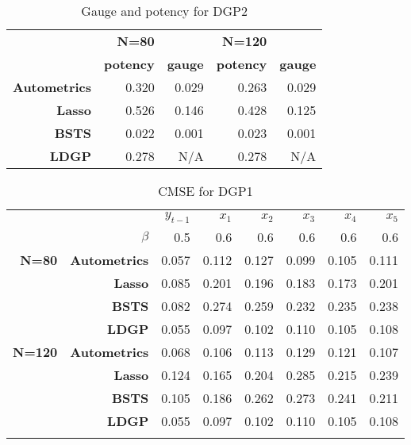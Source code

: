 \documentclass[11pt, oneside]{book}   	%
\begin{document}
\begin{table}[htbp]
  \centering

    \begin{tabular}{rrrrr}

          & \textbf{N=80} & \textbf{} & \textbf{N=120} & \textbf{} \\

          & \textbf{potency} & \textbf{gauge} & \textbf{potency} & \textbf{gauge} \\
    \textbf{Autometrics} & 0.320 & 0.029 & 0.263 & 0.029 \\
    \textbf{Lasso} & 0.526 & 0.146 & 0.428 & 0.125 \\
    \textbf{BSTS} & 0.022 & 0.001 & 0.023 & 0.001 \\
    \textbf{LDGP} & 0.278 & N/A   & 0.278 & N/A \\

    \end{tabular}%
      \caption{Gauge and potency for DGP2}
  \label{DGP2GP}%
\end{table}%





\begin{table}[htbp]
  \centering

    \begin{tabular}{rrrrrrrr}

          &       & $y_{t-1}$ & $x_{1}$ & $x_{2}$ & $x_{3}$ & $x_{4}$ & $x_{5}$ \\

          & $\beta$ & 0.5   & 0.6   & 0.6   & 0.6   & 0.6   & 0.6 \\
    \textbf{N=80} & \textbf{Autometrics} & 0.057 & 0.112 & 0.127 & 0.099 & 0.105 & 0.111 \\
    \textbf{} & \textbf{Lasso} & 0.085 & 0.201 & 0.196 & 0.183 & 0.173 & 0.201 \\
    \textbf{} & \textbf{BSTS} & 0.082 & 0.274 & 0.259 & 0.232 & 0.235 & 0.238 \\
    \textbf{} & \textbf{LDGP} & 0.055 & 0.097 & 0.102 & 0.110 & 0.105 & 0.108 \\
    \textbf{N=120} & \textbf{Autometrics} & 0.068 & 0.106 & 0.113 & 0.129 & 0.121 & 0.107 \\
    \textbf{} & \textbf{Lasso} & 0.124 & 0.165 & 0.204 & 0.285 & 0.215 & 0.239 \\
    \textbf{} & \textbf{BSTS} & 0.105 & 0.186 & 0.262 & 0.273 & 0.241 & 0.211 \\
    \textbf{} & \textbf{LDGP} & 0.055 & 0.097 & 0.102 & 0.110 & 0.105 & 0.108 \\
          &       &       &       &       &       &       &  \\

    \end{tabular}%
      \caption{CMSE for DGP1}
  \label{DGP1CMSE}%
\end{table}%
\end{document}
